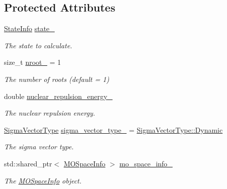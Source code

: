 \subsection*{Protected Attributes}
\begin{DoxyCompactItemize}
\item 
\mbox{\hyperlink{classforte_1_1_state_info}{State\+Info}} \mbox{\hyperlink{classforte_1_1_selected_c_i_method_a416e92640d652c82de433a3da4ae7129}{state\+\_\+}}
\begin{DoxyCompactList}\small\item\em The state to calculate. \end{DoxyCompactList}\item 
size\+\_\+t \mbox{\hyperlink{classforte_1_1_selected_c_i_method_ad2bf5b89d93e44f5692bf4bd9f3dbc18}{nroot\+\_\+}} = 1
\begin{DoxyCompactList}\small\item\em The number of roots (default = 1) \end{DoxyCompactList}\item 
double \mbox{\hyperlink{classforte_1_1_selected_c_i_method_a7dfeaf3ae69832874a435c086d8b64ea}{nuclear\+\_\+repulsion\+\_\+energy\+\_\+}}
\begin{DoxyCompactList}\small\item\em The nuclear repulsion energy. \end{DoxyCompactList}\item 
\mbox{\hyperlink{namespaceforte_a94410e08f0cf9a0cfc5e53c70b6bf485}{Sigma\+Vector\+Type}} \mbox{\hyperlink{classforte_1_1_selected_c_i_method_a05c3865b3eaab402c14237dda4938cf5}{sigma\+\_\+vector\+\_\+type\+\_\+}} = \mbox{\hyperlink{namespaceforte_a94410e08f0cf9a0cfc5e53c70b6bf485a971fd8cc345d8bd9f92e9f7d88fdf20c}{Sigma\+Vector\+Type\+::\+Dynamic}}
\begin{DoxyCompactList}\small\item\em The sigma vector type. \end{DoxyCompactList}\item 
std\+::shared\+\_\+ptr$<$ \mbox{\hyperlink{classforte_1_1_m_o_space_info}{M\+O\+Space\+Info}} $>$ \mbox{\hyperlink{classforte_1_1_selected_c_i_method_a865a22e280d786661f4b75e91ad61136}{mo\+\_\+space\+\_\+info\+\_\+}}
\begin{DoxyCompactList}\small\item\em The \mbox{\hyperlink{classforte_1_1_m_o_space_info}{M\+O\+Space\+Info}} object. \end{DoxyCompactList}\item 

\end{DoxyCompactItemize}
